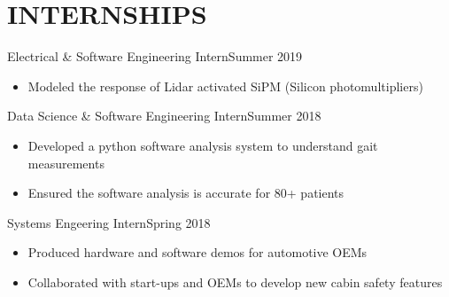
\section*{INTERNSHIPS}


\subtitle{Microvision}{Electrical \& Software Engineering Intern}{Summer 2019}

\begin{itemize}
    \item Modeled the response of Lidar activated SiPM (Silicon photomultipliers)
    
\end{itemize}



\subtitle{TheraNova}{Data Science \& Software Engineering Intern}{Summer 2018}

\begin{itemize}
    \item Developed a python software analysis system to understand gait measurements
    \item Ensured the software analysis is accurate for 80+ patients

\end{itemize}



\subtitle{Valeo}{Systems Engeering Intern}{Spring 2018}

\begin{itemize}
    \item Produced hardware and software demos for automotive OEMs
    \item Collaborated with start-ups and OEMs to develop new cabin safety features

\end{itemize}


